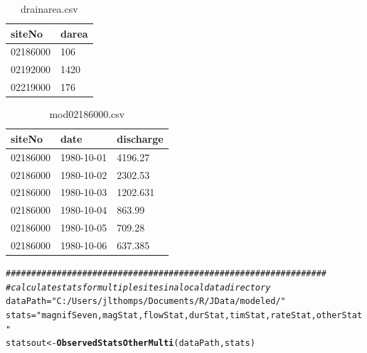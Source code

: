 \documentclass[a4paper,11pt]{article}\usepackage[]{graphicx}\usepackage[]{color}
\makeatletter
\newcommand{\hlstr}[1]{\textcolor[rgb]{0.192,0.494,0.8}{#1}}%
\newcommand{\hlcom}[1]{\textcolor[rgb]{0.678,0.584,0.686}{\textit{#1}}}%
\newcommand{\hlstd}[1]{\textcolor[rgb]{0.345,0.345,0.345}{#1}}%
\newcommand{\hlkwb}[1]{\textcolor[rgb]{0.69,0.353,0.396}{#1}}%
\newcommand{\hlkwd}[1]{\textcolor[rgb]{0.737,0.353,0.396}{\textbf{#1}}}%
\newenvironment{kframe}{%
 \def\at@end@of@kframe{}%
 \ifinner\ifhmode%
  \def\at@end@of@kframe{\end{minipage}}%
  \begin{minipage}{\columnwidth}%
 \fi\fi%
 \def\FrameCommand##1{\hskip\@totalleftmargin \hskip-\fboxsep
 \colorbox{shadecolor}{##1}\hskip-\fboxsep
     \hskip-\linewidth \hskip-\@totalleftmargin \hskip\columnwidth}%
 \MakeFramed {\advance\hsize-\width
   \@totalleftmargin\z@ \linewidth\hsize
   \@setminipage}}%
 {\par\unskip\endMakeFramed%
 \at@end@of@kframe}
\newenvironment{knitrout}{}{} %
\makeatother
\begin{document}
\begin{table}[ht]
  \begin{threeparttable}[b]
  \caption{drainarea.csv}
  \label{tab:darea}
  \begin{tabularx}{250pt}{|X|X|}
  \hline
\textbf{siteNo} & \textbf{darea} \\ 
  \hline\hline
  02186000 & 106 \\ \hline
  02192000 & 1420 \\ \hline
  02219000 & 176 \\
  \hline
  \end{tabularx}
  \end{threeparttable}
\end{table}

\begin{table}[ht]
  \begin{threeparttable}[b]
  \caption{mod02186000.csv}
  \label{tab:moddata}
  \begin{tabularx}{350pt}{|X|X|X|}
  \hline
\textbf{siteNo} & \textbf{date} & \textbf{discharge} \\ 
  \hline\hline
  02186000 & 1980-10-01 & 4196.27 \\ \hline
  02186000 & 1980-10-02 & 2302.53 \\ \hline
  02186000 & 1980-10-03 & 1202.631 \\ \hline
  02186000 & 1980-10-04 & 863.99 \\ \hline
  02186000 & 1980-10-05 & 709.28 \\ \hline
  02186000 & 1980-10-06 & 637.385 \\
  \hline
  \end{tabularx}
  \end{threeparttable}
\end{table}

\begin{knitrout}
\color{fgcolor}\begin{kframe}
\begin{alltt}
\hlcom{###############################################################}
\hlcom{# calculate stats for multiple sites in a local data directory}
\hlstd{dataPath}\hlkwb{=}\hlstr{"C:/Users/jlthomps/Documents/R/JData/modeled/"}
\hlstd{stats}\hlkwb{=}\hlstr{"magnifSeven,magStat,flowStat,durStat,timStat,rateStat,otherStat"}
\hlstd{statsout} \hlkwb{<-} \hlkwd{ObservedStatsOtherMulti}\hlstd{(dataPath,stats)}
\end{alltt}
\end{kframe}
\end{knitrout}
\end{document}
